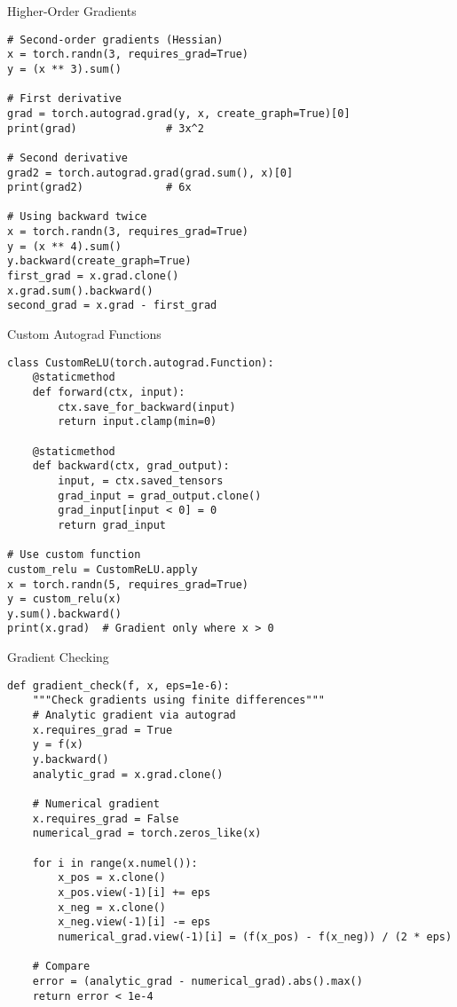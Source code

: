 \documentclass[aspectratio=169,10pt]{beamer}
\begin{document}
\begin{frame}[fragile]{Higher-Order Gradients}
\begin{lstlisting}
# Second-order gradients (Hessian)
x = torch.randn(3, requires_grad=True)
y = (x ** 3).sum()

# First derivative
grad = torch.autograd.grad(y, x, create_graph=True)[0]
print(grad)              # 3x^2

# Second derivative
grad2 = torch.autograd.grad(grad.sum(), x)[0]
print(grad2)             # 6x

# Using backward twice
x = torch.randn(3, requires_grad=True)
y = (x ** 4).sum()
y.backward(create_graph=True)
first_grad = x.grad.clone()
x.grad.sum().backward()
second_grad = x.grad - first_grad
\end{lstlisting}
\end{frame}

\begin{frame}[fragile]{Custom Autograd Functions}
\begin{lstlisting}
class CustomReLU(torch.autograd.Function):
    @staticmethod
    def forward(ctx, input):
        ctx.save_for_backward(input)
        return input.clamp(min=0)
    
    @staticmethod
    def backward(ctx, grad_output):
        input, = ctx.saved_tensors
        grad_input = grad_output.clone()
        grad_input[input < 0] = 0
        return grad_input

# Use custom function
custom_relu = CustomReLU.apply
x = torch.randn(5, requires_grad=True)
y = custom_relu(x)
y.sum().backward()
print(x.grad)  # Gradient only where x > 0
\end{lstlisting}
\end{frame}

\begin{frame}[fragile]{Gradient Checking}
\begin{lstlisting}
def gradient_check(f, x, eps=1e-6):
    """Check gradients using finite differences"""
    # Analytic gradient via autograd
    x.requires_grad = True
    y = f(x)
    y.backward()
    analytic_grad = x.grad.clone()
    
    # Numerical gradient
    x.requires_grad = False
    numerical_grad = torch.zeros_like(x)
    
    for i in range(x.numel()):
        x_pos = x.clone()
        x_pos.view(-1)[i] += eps
        x_neg = x.clone()
        x_neg.view(-1)[i] -= eps
        numerical_grad.view(-1)[i] = (f(x_pos) - f(x_neg)) / (2 * eps)
    
    # Compare
    error = (analytic_grad - numerical_grad).abs().max()
    return error < 1e-4
\end{lstlisting}
\end{frame}
\end{document}
